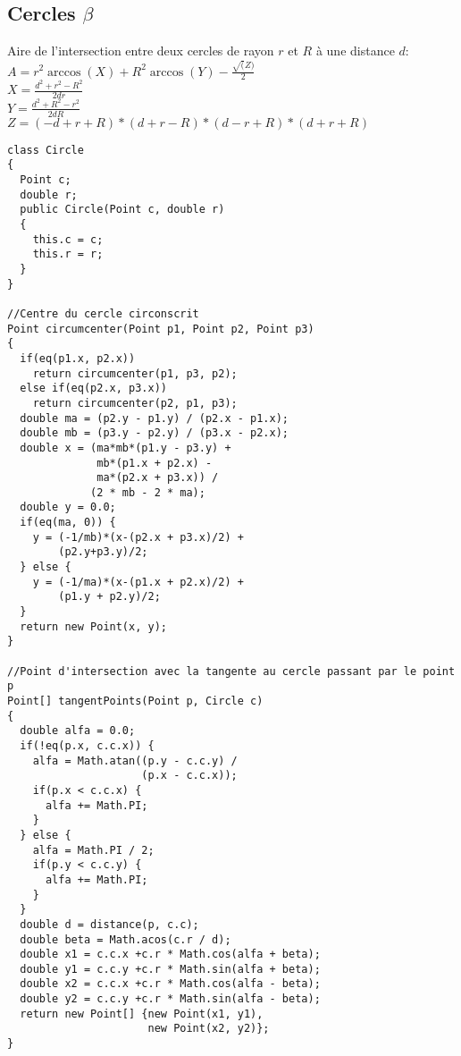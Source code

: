 \subsection[Cercles]{Cercles $\beta$}
Aire de l'intersection entre deux cercles de rayon $r$ et $R$ à une distance $d$:
$A = r^2\arccos(X) + R^2 \arccos(Y) - \frac{\sqrt(Z)}{2}$\\
$X = \frac{d^2+r^2-R^2}{2dr}$\\
$Y = \frac{d^2+R^2-r^2}{2dR}$\\
$Z = (-d+r+R)*(d+r-R)*(d-r+R)*(d+r+R)$
\begin{lstlisting}
class Circle
{
  Point c;
  double r;
  public Circle(Point c, double r)
  {
    this.c = c;
    this.r = r;
  }
}

//Centre du cercle circonscrit
Point circumcenter(Point p1, Point p2, Point p3)
{
  if(eq(p1.x, p2.x))
    return circumcenter(p1, p3, p2);
  else if(eq(p2.x, p3.x))
    return circumcenter(p2, p1, p3);
  double ma = (p2.y - p1.y) / (p2.x - p1.x);
  double mb = (p3.y - p2.y) / (p3.x - p2.x);
  double x = (ma*mb*(p1.y - p3.y) + 
              mb*(p1.x + p2.x) - 
              ma*(p2.x + p3.x)) / 
             (2 * mb - 2 * ma);
  double y = 0.0;
  if(eq(ma, 0)) {
    y = (-1/mb)*(x-(p2.x + p3.x)/2) +  
        (p2.y+p3.y)/2; 	
  } else {
    y = (-1/ma)*(x-(p1.x + p2.x)/2) + 
        (p1.y + p2.y)/2; 	
  }
  return new Point(x, y);
}

//Point d'intersection avec la tangente au cercle passant par le point p
Point[] tangentPoints(Point p, Circle c)
{
  double alfa = 0.0;
  if(!eq(p.x, c.c.x)) {
    alfa = Math.atan((p.y - c.c.y) / 
                     (p.x - c.c.x));
    if(p.x < c.c.x) {
      alfa += Math.PI;
    }
  } else {
    alfa = Math.PI / 2;
    if(p.y < c.c.y) {
      alfa += Math.PI;
    }
  }
  double d = distance(p, c.c);
  double beta = Math.acos(c.r / d);	    
  double x1 = c.c.x +c.r * Math.cos(alfa + beta);  
  double y1 = c.c.y +c.r * Math.sin(alfa + beta);
  double x2 = c.c.x +c.r * Math.cos(alfa - beta);  
  double y2 = c.c.y +c.r * Math.sin(alfa - beta);  
  return new Point[] {new Point(x1, y1), 
                      new Point(x2, y2)};
}
\end{lstlisting}
